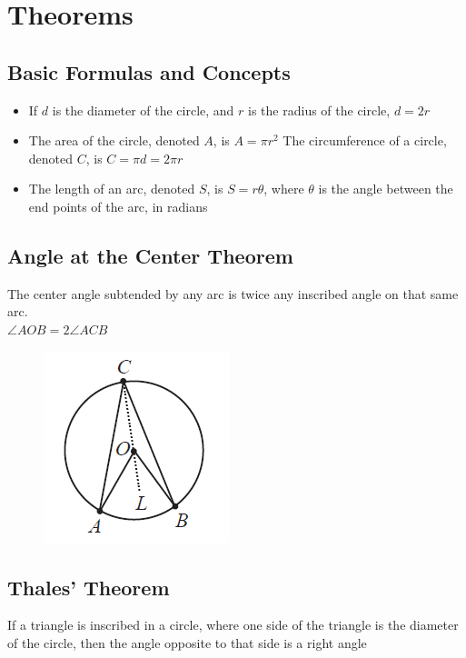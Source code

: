 \documentclass[12pt]{article}
\begin{document}
\newpage

\section{Theorems}
\subsection{Basic Formulas and Concepts}
\begin{itemize}
    \item If $d$ is the diameter of the circle, and $r$ is the  radius of the circle, $d = 2r$
    \item The area of the circle, denoted $A$, is $A = \pi r^2$
    \itme The circumference of a circle, denoted $C$, is $C = \pi d = 2\pi r$
    \item The length of an arc, denoted $S$, is $S = r\theta$, where $\theta$ is the angle between the end points of the arc, in radians
\end{itemize}

\subsection{Angle at the Center Theorem}
The center angle subtended by any arc is twice any inscribed angle on that same arc. \\ $\angle AOB = 2\angle ACB$

\vspace{-5mm}
\begin{figure}[h!]
    \centering
	\includegraphics[height=0.15\textheight]{Graphics/Week_13/StarTreck.png}
\end{figure}
\vspace{-8mm}

\subsection{Thales' Theorem}
If a triangle is inscribed in a circle, where one side of the triangle is the diameter of the circle, then the angle opposite to that side is a right angle
\end{document}
